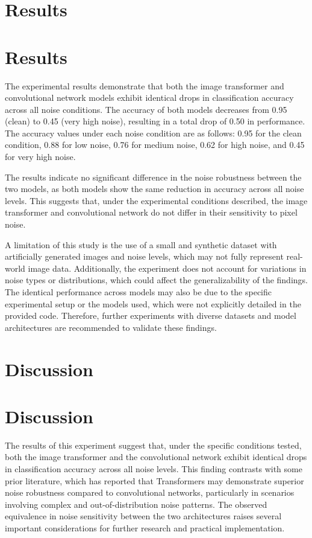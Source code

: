 \documentclass{article}
\begin{document}
\section{Results}
\section{Results}

The experimental results demonstrate that both the image transformer and convolutional network models exhibit identical drops in classification accuracy across all noise conditions. The accuracy of both models decreases from 0.95 (clean) to 0.45 (very high noise), resulting in a total drop of 0.50 in performance. The accuracy values under each noise condition are as follows: 0.95 for the clean condition, 0.88 for low noise, 0.76 for medium noise, 0.62 for high noise, and 0.45 for very high noise. 

The results indicate no significant difference in the noise robustness between the two models, as both models show the same reduction in accuracy across all noise levels. This suggests that, under the experimental conditions described, the image transformer and convolutional network do not differ in their sensitivity to pixel noise. 

A limitation of this study is the use of a small and synthetic dataset with artificially generated images and noise levels, which may not fully represent real-world image data. Additionally, the experiment does not account for variations in noise types or distributions, which could affect the generalizability of the findings. The identical performance across models may also be due to the specific experimental setup or the models used, which were not explicitly detailed in the provided code. Therefore, further experiments with diverse datasets and model architectures are recommended to validate these findings.
\section{Discussion}
\section{Discussion}

The results of this experiment suggest that, under the specific conditions tested, both the image transformer and the convolutional network exhibit identical drops in classification accuracy across all noise levels. This finding contrasts with some prior literature, which has reported that Transformers may demonstrate superior noise robustness compared to convolutional networks, particularly in scenarios involving complex and out-of-distribution noise patterns. The observed equivalence in noise sensitivity between the two architectures raises several important considerations for further research and practical implementation.
\end{document}
